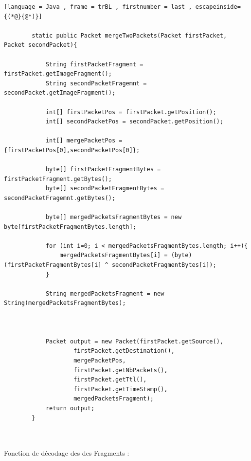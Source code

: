         \begin{lstlisting}[language = Java , frame = trBL , firstnumber = last , escapeinside={(*@}{@*)}]
        
        static public Packet mergeTwoPackets(Packet firstPacket, Packet secondPacket){

            String firstPacketFragment = firstPacket.getImageFragment();
            String secondPacketFragemnt =  secondPacket.getImageFragment();
    
            int[] firstPacketPos = firstPacket.getPosition();
            int[] secondPacketPos = secondPacket.getPosition();
    
            int[] mergePacketPos = {firstPacketPos[0],secondPacketPos[0]};
    
            byte[] firstPacketFragmentBytes = firstPacketFragment.getBytes();
            byte[] secondPacketFragmentBytes = secondPacketFragemnt.getBytes();
    
            byte[] mergedPacketsFragmentBytes = new byte[firstPacketFragmentBytes.length];
    
            for (int i=0; i < mergedPacketsFragmentBytes.length; i++){
                mergedPacketsFragmentBytes[i] = (byte) (firstPacketFragmentBytes[i] ^ secondPacketFragmentBytes[i]);
            }
    
            String mergedPacketsFragment = new String(mergedPacketsFragmentBytes);
    
    
    
            Packet output = new Packet(firstPacket.getSource(),
                    firstPacket.getDestination(),
                    mergePacketPos,
                    firstPacket.getNbPackets(),
                    firstPacket.getTtl(),
                    firstPacket.getTimeStamp(),
                    mergedPacketsFragment);
            return output;
        }
        
        \end{lstlisting}
        \\
        
        Fonction de décodage des des Fragments :
        

